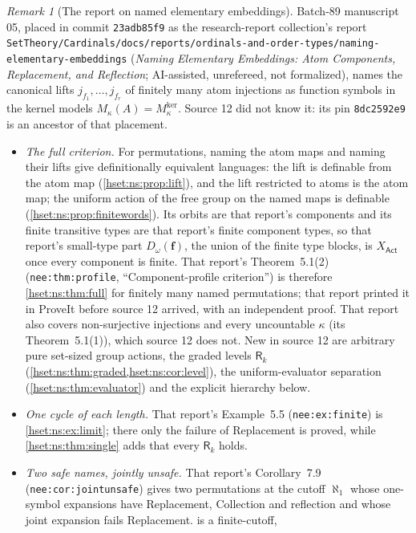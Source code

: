 \documentclass[11pt,letterpaper]{article}
\theoremstyle{definition}
\theoremstyle{remark}
\newtheorem{remark}[remark]{Remark}\aliascntresetthe{remark}
\newcommand{\lbl}[1]{\nolinkurl{#1}}
\newcommand{\repo}[1]{\nolinkurl{#1}}
\newcommand{\Mker}{M^{\mathrm{ker}}}
\newcommand{\Act}{\mathsf{Act}}
\begin{document}
\begin{remark}[The report on named elementary embeddings]
\label{hset:ns:rem:nee}
Batch-89 manuscript 05, placed in commit \texttt{23adb85f9} as the
research-report collection's report
\repo{SetTheory/Cardinals/docs/reports/ordinals-and-order-types/naming-elementary-embeddings}
(\emph{Naming Elementary Embeddings: Atom Components, Replacement, and
Reflection}; AI-assisted, unrefereed, not formalized), names the canonical lifts
$j_{f_1},\dots,j_{f_r}$ of finitely many atom injections as function symbols in
the kernel models $M_\kappa(A)=\Mker_\kappa$. Source 12 did not know it: its pin
\texttt{8dc2592e9} is an ancestor of that placement.
\begin{itemize}
\item \emph{The full criterion.} For permutations, naming the atom maps and
naming their lifts give definitionally equivalent languages: the lift is
definable from the atom map (\cref{hset:ns:prop:lift}), and the lift restricted
to atoms is the atom map; the uniform action of the free group on the named maps
is definable (\cref{hset:ns:prop:finitewords}). Its orbits are that report's
components and its finite transitive types are that report's finite component
types, so that report's small-type part $D_\omega(\boldsymbol f)$, the union of
the finite type blocks, is $X_{\Act}$ once every component is finite. That
report's Theorem~5.1(2) (\lbl{nee:thm:profile}, ``Component-profile
criterion'') is therefore \cref{hset:ns:thm:full} for finitely many named
permutations; that report printed it in ProveIt before source 12 arrived, with
an independent proof. That report also covers non-surjective injections and every uncountable
$\kappa$ (its Theorem~5.1(1)), which source 12 does not. New in source 12 are
arbitrary pure set-sized group actions, the graded levels $\mathsf R_k$
(\cref{hset:ns:thm:graded,hset:ns:cor:level}), the uniform-evaluator
separation (\cref{hset:ns:thm:evaluator}) and the explicit hierarchy below.
\item \emph{One cycle of each length.} That report's Example~5.5
(\lbl{nee:ex:finite}) is \cref{hset:ns:ex:limit}; there only the failure of
Replacement is proved, while \cref{hset:ns:thm:single} adds that every
$\mathsf R_k$ holds.
\item \emph{Two safe names, jointly unsafe.} That report's Corollary~7.9
(\lbl{nee:cor:jointunsafe}) gives two permutations at the cutoff $\aleph_1$ whose
one-symbol expansions have Replacement, Collection and reflection and whose
joint expansion fails Replacement.  is a finite-cutoff,

\end{itemize}
\end{remark}
\end{document}
